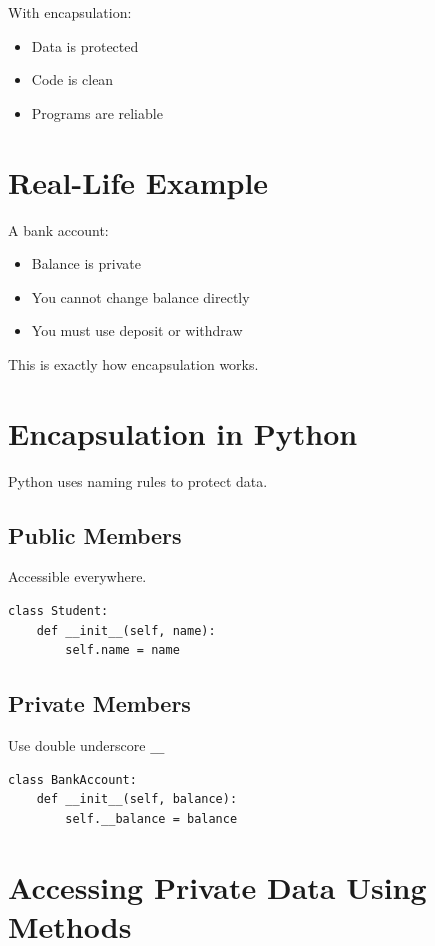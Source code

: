 With encapsulation:
\begin{itemize}
    \item Data is protected
    \item Code is clean
    \item Programs are reliable
\end{itemize}

\section{Real-Life Example}

A bank account:
\begin{itemize}
    \item Balance is private
    \item You cannot change balance directly
    \item You must use deposit or withdraw
\end{itemize}

This is exactly how encapsulation works.

\section{Encapsulation in Python}

Python uses naming rules to protect data.

\subsection{Public Members}

Accessible everywhere.

\begin{verbatim}
class Student:
    def __init__(self, name):
        self.name = name
\end{verbatim}

\subsection{Private Members}

Use double underscore \texttt{\_\_}

\begin{verbatim}
class BankAccount:
    def __init__(self, balance):
        self.__balance = balance
\end{verbatim}

\section{Accessing Private Data Using Methods}

